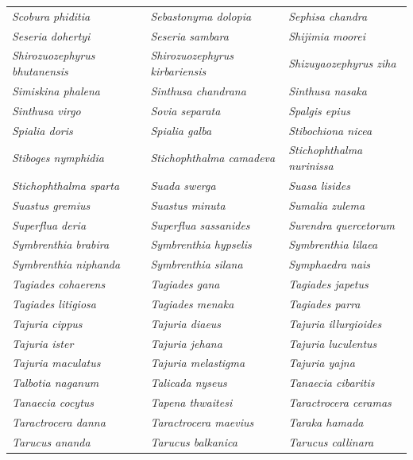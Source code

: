 \documentclass[runningheads]{llncs}
\begin{document}
\begin{longtable}{lll}
\textit{Scobura phiditia} & \textit{Sebastonyma dolopia} & \textit{Sephisa chandra} \\
\textit{Seseria dohertyi} & \textit{Seseria sambara} & \textit{Shijimia moorei} \\
\textit{Shirozuozephyrus bhutanensis} & \textit{Shirozuozephyrus kirbariensis} & \textit{Shizuyaozephyrus ziha} \\
\textit{Simiskina phalena} & \textit{Sinthusa chandrana} & \textit{Sinthusa nasaka} \\
\textit{Sinthusa virgo} & \textit{Sovia separata} & \textit{Spalgis epius} \\
\textit{Spialia doris} & \textit{Spialia galba} & \textit{Stibochiona nicea} \\
\textit{Stiboges nymphidia} & \textit{Stichophthalma camadeva} & \textit{Stichophthalma nurinissa} \\
\textit{Stichophthalma sparta} & \textit{Suada swerga} & \textit{Suasa lisides} \\
\textit{Suastus gremius} & \textit{Suastus minuta} & \textit{Sumalia zulema} \\
\textit{Superflua deria} & \textit{Superflua sassanides} & \textit{Surendra quercetorum} \\
\textit{Symbrenthia brabira} & \textit{Symbrenthia hypselis} & \textit{Symbrenthia lilaea} \\
\textit{Symbrenthia niphanda} & \textit{Symbrenthia silana} & \textit{Symphaedra nais} \\
\textit{Tagiades cohaerens} & \textit{Tagiades gana} & \textit{Tagiades japetus} \\
\textit{Tagiades litigiosa} & \textit{Tagiades menaka} & \textit{Tagiades parra} \\
\textit{Tajuria cippus} & \textit{Tajuria diaeus} & \textit{Tajuria illurgioides} \\
\textit{Tajuria ister} & \textit{Tajuria jehana} & \textit{Tajuria luculentus} \\
\textit{Tajuria maculatus} & \textit{Tajuria melastigma} & \textit{Tajuria yajna} \\
\textit{Talbotia naganum} & \textit{Talicada nyseus} & \textit{Tanaecia cibaritis} \\
\textit{Tanaecia cocytus} & \textit{Tapena thwaitesi} & \textit{Taractrocera ceramas} \\
\textit{Taractrocera danna} & \textit{Taractrocera maevius} & \textit{Taraka hamada} \\
\textit{Tarucus ananda} & \textit{Tarucus balkanica} & \textit{Tarucus callinara} \\

\end{longtable}
\end{document}
